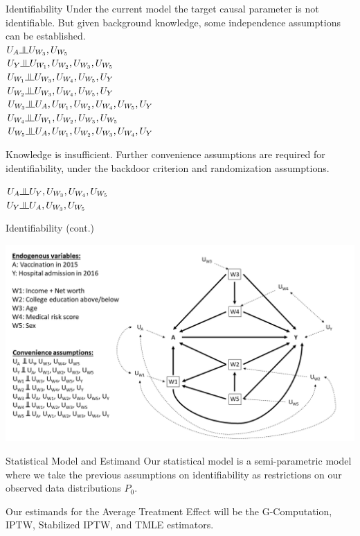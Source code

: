\documentclass[english]{beamer}
\newcommand{\indep}{\raisebox{0.05em}{\rotatebox[origin=c]{90}{$\models$}}}
\begin{document}
\begin{frame}{Identifiability}
Under the current model the target causal parameter is not identifiable. But given background knowledge, some independence assumptions can be established.\\
$U_{A} \indep U_{W_{3}}, U_{W_{5}}$ \\
$U_{Y} \indep U_{W_{1}}, U_{W_{2}}, U_{W_{3}}, U_{W_{5}}$ \\
$U_{W_{1}} \indep U_{W_{3}}, U_{W_{4}}, U_{W_{5}}, U_{Y}$ \\
$U_{W_{2}} \indep U_{W_{3}}, U_{W_{4}}, U_{W_{5}}, U_{Y}$ \\
$U_{W_{3}} \indep U_{A}, U_{W_{1}}, U_{W_{2}}, U_{W_{4}}, U_{W_{5}}, U_{Y}$ \\
$U_{W_{4}} \indep U_{W_{1}}, U_{W_{2}}, U_{W_{3}}, U_{W_{5}}$ \\
$U_{W_{5}} \indep U_{A}, U_{W_{1}}, U_{W_{2}}, U_{W_{3}}, U_{W_{4}}, U_{Y}$
\par
Knowledge is insufficient. Further convenience assumptions are required for identifiability, under the backdoor criterion and randomization assumptions.  
\par
$U_{A} \indep U_{Y}, U_{W_{3}}, U_{W_{4}}, U_{W_{5}}$ \\
$U_{Y} \indep U_{A}, U_{W_{3}}, U_{W_{5}}$
\end{frame}

\begin{frame}{Identifiability (cont.)}
\centerline{\includegraphics[scale=.38]{figures/DAG_identifiable.png}}
\end{frame}

\begin{frame}{Statistical Model and Estimand}
Our statistical model is a semi-parametric model where we take the previous assumptions on identifiability as restrictions on our observed data distributions $P_0$. 

Our estimands for the Average Treatment Effect will be the G-Computation, IPTW, Stabilized IPTW, and TMLE estimators.
\end{frame}
\end{document}
